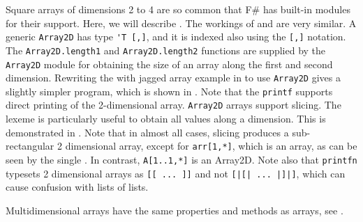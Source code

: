 \documentclass[fsharpNotes.tex]{subfiles}
\begin{document}
Square arrays of dimensions 2 to 4 are so common that F\# has built-in modules for their support. Here, we will describe . The workings of  and  are very similar. A generic \lstinline{Array2D} has type \lstinline{'T [,]}, and it is indexed also using the \lstinline|[,]| notation. The \lstinline{Array2D.length1} and \lstinline{Array2D.length2} functions are supplied by the \lstinline{Array2D} module for obtaining the size of an array along the first and second dimension. Rewriting the with jagged array example in  to use \lstinline{Array2D} gives a slightly simpler program, which is shown in .
%
%
Note that the \lstinline!printf! supports direct printing of the 2-dimensional array. \lstinline{Array2D} arrays support slicing. The \lexeme{*} lexeme is particularly useful to obtain all values along a dimension. This is demonstrated in .
%
%
Note that in almost all cases, slicing produces a sub-rectangular 2 dimensional array, except for \lstinline{arr[1,*]}, which is an array, as can be seen by the single \lexeme{[}. In contrast, \lstinline{A[1..1,*]} is an Array2D. Note also that \lstinline!printfn! typesets 2 dimensional arrays as \lstinline{[[ ... ]]} and not \lstinline{[|[| ... |]|]}, which can cause confusion with lists of lists.

Multidimensional arrays have the same properties and methods as arrays, see .
\clearpage
\end{document}
